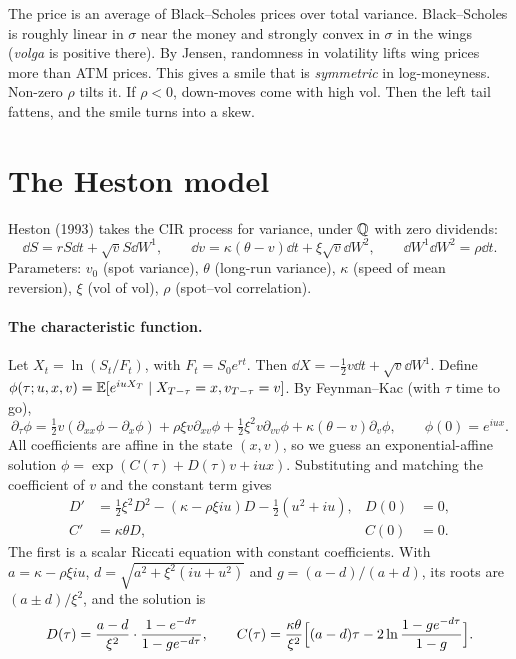 \begin{intuition}
The price is an average of Black--Scholes prices over total variance. Black--Scholes is roughly linear in $\sigma$ near the money and strongly convex in $\sigma$ in the wings (\emph{volga} is positive there). By Jensen, randomness in volatility lifts wing prices more than ATM prices. This gives a smile that is \emph{symmetric} in log-moneyness. Non-zero $\rho$ tilts it. If $\rho<0$, down-moves come with high vol. Then the left tail fattens, and the smile turns into a skew.
\end{intuition}

\section{The Heston model}\label{sec:heston}

Heston (1993) takes the CIR process for variance, under $\mathbb{Q}$ with zero dividends:
\[
\dd S=rS\dd t+\sqrt vS\dd W^1,\qquad\dd v=\kappa(\theta-v)\dd t+\xi\sqrt v\dd W^2,\qquad\dd W^1\dd W^2=\rho\dd t.
\]
Parameters: $v_0$ (spot variance), $\theta$ (long-run variance), $\kappa$ (speed of mean reversion), $\xi$ (vol of vol), $\rho$ (spot--vol correlation).

\paragraph{The characteristic function.} Let $X_t=\ln(S_t/F_t)$, with $F_t=S_0e^{rt}$. Then $\dd X=-\tfrac12v\dd t+\sqrt v\dd W^1$. Define $\phi(\tau;u,x,v)=\mathbb{E}[e^{iuX_T}\mid X_{T-\tau}=x,v_{T-\tau}=v]$. By Feynman--Kac (with $\tau$ time to go),
\[
\partial_\tau\phi=\tfrac12v(\partial_{xx}\phi-\partial_x\phi)+\rho\xi v\partial_{xv}\phi+\tfrac12\xi^2v\partial_{vv}\phi+\kappa(\theta-v)\partial_v\phi,\qquad\phi(0)=e^{iux}.
\]
All coefficients are affine in the state $(x,v)$, so we guess an exponential-affine solution $\phi=\exp(C(\tau)+D(\tau)v+iux)$. Substituting and matching the coefficient of $v$ and the constant term gives
\begin{align*}
D'&=\tfrac12\xi^2D^2-(\kappa-\rho\xi iu)D-\tfrac12(u^2+iu),&D(0)&=0,\\
C'&=\kappa\theta D,&C(0)&=0.
\end{align*}
The first is a scalar Riccati equation with constant coefficients. With $a=\kappa-\rho\xi iu$, $d=\sqrt{a^2+\xi^2(iu+u^2)}$ and $g=(a-d)/(a+d)$, its roots are $(a\pm d)/\xi^2$, and the solution is
\begin{equation}\label{eq:hestoncf}
D(\tau)=\frac{a-d}{\xi^2}\cdot\frac{1-e^{-d\tau}}{1-ge^{-d\tau}},\qquad C(\tau)=\frac{\kappa\theta}{\xi^2}\Bigl[(a-d)\tau-2\ln\frac{1-ge^{-d\tau}}{1-g}\Bigr].
\end{equation}

